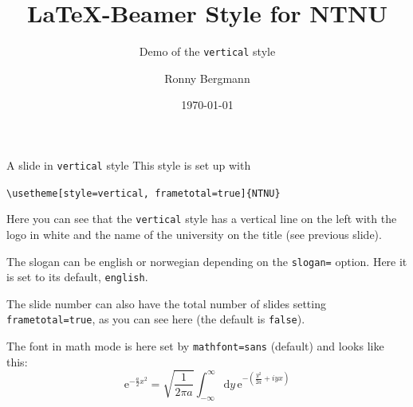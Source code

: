 \documentclass[aspectratio=169]{beamer}
\title{\LaTeX{}-Beamer Style for NTNU}
\subtitle{Demo of the  \texttt{vertical} style}
\author{Ronny Bergmann}
\date{\today}
\begin{document}
	\maketitle
		\begin{frame}[fragile]{A slide in \texttt{vertical} style}
			This style is set up with

			\lstinline!\usetheme[style=vertical, frametotal=true]{NTNU}!

			Here you can see that the \texttt{vertical} style has a vertical line on the left with the logo in white and the name of the university on the title (see previous slide).

			The slogan can be english or norwegian depending on the \lstinline!slogan=! option. Here it is set to its default, \lstinline!english!.

			The slide number can also have the total number of slides setting \lstinline!frametotal=true!,
            as you can see here (the default is \lstinline!false!).

            The font in math mode is here set by \lstinline!mathfont=sans! (default) and looks like this: \[\mathrm{e}^{-\frac{a}{2}x^2} = \sqrt{\frac{1}{2\pi a}} \int_{-\infty}^\infty\mathrm{d}y\, \mathrm{e}^{-\left(\frac{y^2}{2a} +iy x\right)}\]
		\end{frame}
\end{document}
